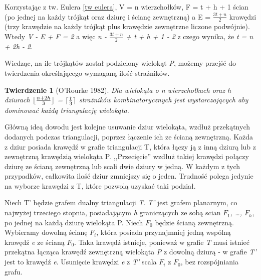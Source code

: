 \documentclass[brudnopis]{xmgr}
\DeclarePairedDelimiter\ceil{\lceil}{\rceil}
\DeclarePairedDelimiter\floor{\lfloor}{\rfloor}
\newtheorem{Twierdzenie}{Twierdzenie}
\begin{document}
Korzystając z tw. Eulera \ref{tw eulera}, V = n wierzchołków, F = t + h + 1 ścian (po jednej na każdy trójkąt oraz dziurę i ścianę zewnętrzną) a E = $\frac{3t+n}{2}$ krawędzi (trzy krawędzie na każdy trójkąt plus krawędzie zewnętrzne liczone podwójnie).  Wtedy \textit{V - E + F = 2} a więc \textit{n - $\frac{3t+n}{2}$ + t + h + 1 - 2} z czego wynika, że \textit{t = n + 2h - 2}.


Wiedząc, na ile trójkątów został podzielony wielokąt \textit{P}, możemy przejść do twierdzenia określającego wymaganą ilość strażników.

\begin{Twierdzenie}[O'Rourke 1982]
  Dla wielokąta o n wierzchołkach oraz h dziurach $\floor{\frac{n+2h}{3}}$ = $\ceil{\frac{t}{3}}$ strażników kombinatorycznych jest wystarczających aby dominować każdą triangulację wielokąta.
\end{Twierdzenie}

\indent Główną ideą dowodu jest kolejne usuwanie dziur wielokąta, wzdłuż przekątnych dodanych podczas triangulacji, poprzez łączenie ich ze ścianą zewnętrzną. Każda z dziur posiada krawędź w grafie triangulacji T, która łączy ją z inną dziurą lub z zewnętrzną krawędzią wielokąta P. ,,Przecięcie'' wzdłuż takiej krawędzi połączy dziurę ze ścianą zewnętrzną lub scali dwie dziury w jedną. W każdym z tych przypadków, całkowita ilość dziur zmniejszy się o jeden. Trudność polega jedynie na wyborze krawędzi z T, które pozwolą uzyskać taki podział.

\indent Niech T' będzie grafem dualny triangulacji \textit{T}. \textit{T'} jest grafem planarnym, co najwyżej trzeciego stopnia, posiadającym \textit{h} graniczących ze sobą scian \textit{$F_1$, \ldots, $F_h$}, po jednej na każdą dziurę wielokąta P. Niech $F_0$ będzie ścianą zewnętrzną. Wybieramy dowolną ścianę $F_i$, która posiada przynajmniej jedną wspólną krawędź \textit{e} ze ścianą $F_0$. Taka krawędź istnieje, ponieważ w grafie \textit{T} musi istnieć przekątna łącząca krawędź zewnętrzną wielokąta \textit{P} z dowolną dziurą - w grafie \textit{T'} jest to krawędź \textit{e}. Usunięcie krawędzi \textit{e} z \textit{T'} scala \textit{$F_i$} z $F_0$, bez rozspójniania grafu.
\end{document}
